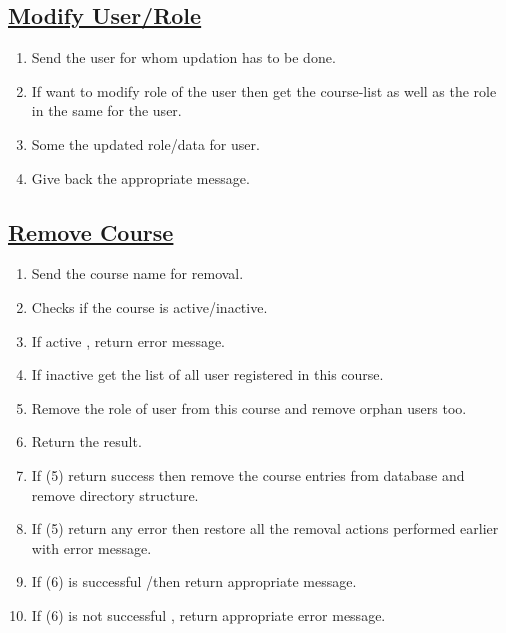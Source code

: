 \documentclass{article}
\begin{document}
\subsection*{\underline{Modify User/Role}}
\begin{enumerate}
\item Send the user for whom updation has to be done.
\item If want to modify role of the user then get the course-list as well as the role in the same for the user.
\item Some the updated role/data for user.
\item Give back the appropriate message.
\end{enumerate}
\begin{center}

\end{center}
\subsection*{\underline{Remove Course}}
\begin{enumerate}
\item Send the course name for removal.
\item Checks if the course is active/inactive.
\item If active , return error message.
\item If inactive get the list of all user registered in this course.
\item Remove the role of user from this course and remove orphan users too.
\item Return the result.
\item If (5) return success then remove the course entries from database and remove directory structure. 
\item If (5) return any error then restore all the removal actions performed earlier with error message.
\item If (6) is successful /then return appropriate message. 
\item If (6) is not successful , return appropriate error message.
\end{enumerate}

\begin{center}

\end{center}
\end{document}
